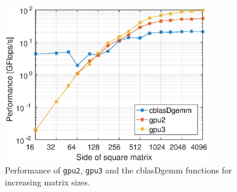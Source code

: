 \begin{figure}
\centering
\includegraphics[width = 0.8\textwidth]{fig/gpu3.eps}
\caption{Performance of \texttt{gpu2}, \texttt{gpu3} and the cblasDgemm functions for increasing matrix sizes.}
\label{fig:gpu3}
\end{figure}
